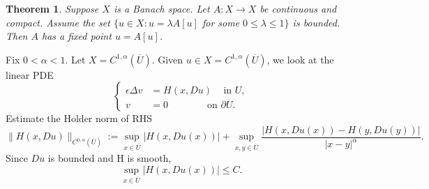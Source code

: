 \documentclass[11pt,reqno]{amsart}
\numberwithin{figure}{section}
\theoremstyle{plain}
\newtheorem{thm}{Theorem}[section]
\theoremstyle{remark}
\numberwithin{equation}{section}
\begin{document}
\begin{appendices}
\begin{thm} Suppose $X$ is a Banach space. Let $A:X \to X$ be continuous and compact. Assume the set $\{u\in X : u=\lambda A[u]$ for some $0 \leq  \lambda \leq 1\}$ is bounded. Then $A$ has a fixed point $u =A[u]$.
\end{thm}
\noindent Fix $0<\alpha<1$. Let $X=C^{1,\alpha}(\overline{U})$. Given $u \in X=C^{1,\alpha}(\overline{U})$, we look at the linear PDE
\begin{equation}
\label{fix}
\left\{
  \begin{aligned}
   \epsilon \Delta v &= H(x, Du) \quad \, \text{in } U, \\
              v &= 0 \qquad \qquad \text{on } \partial U.
  \end{aligned}
\right.
\end{equation}
\noindent
Estimate the Holder norm of RHS
$$\|H(x, Du)\|_{C^{0, \alpha}(\overline{U})}:=\sup_{x\in\overline{U}} |H(x,Du(x))| + \sup_{x, y \in \overline{U}}\frac{|H(x, Du(x))-H(y, Du(y))|}{|x-y|^\alpha}.$$
Since $Du$ is bounded and H is smooth,
\begin{equation}
    \sup_{x\in\overline{U}} |H(x,Du(x))| \leq C.
\end{equation}


\end{appendices}
\end{document}
